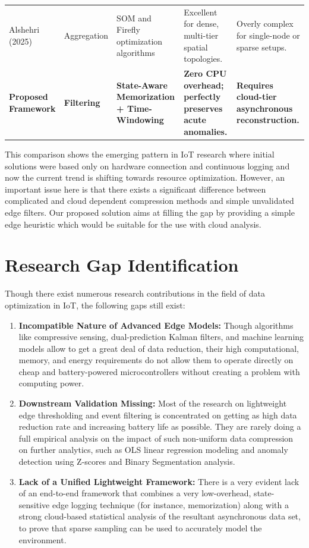 \begin{table}[htpb]
{\begin{tabular}{@{}llp{4cm}p{4cm}p{4cm}@{}}
        \addlinespace
        Alshehri (2025) \cite{ref17, ref37, ref57} & Aggregation & SOM and Firefly optimization algorithms & Excellent for dense, multi-tier spatial topologies. & Overly complex for single-node or sparse setups. \\
        \addlinespace
        \textbf{Proposed Framework} & \textbf{Filtering} & \textbf{State-Aware Memorization + Time-Windowing} & \textbf{Zero CPU overhead; perfectly preserves acute anomalies.} & \textbf{Requires cloud-tier asynchronous reconstruction.} \\
        \bottomrule
    \end{tabular}
    }
\end{table}

This comparison shows the emerging pattern in IoT research where initial solutions were based only on hardware connection and continuous logging and now the current trend is shifting towards resource optimization. However, an important issue here is that there exists a significant difference between complicated and cloud dependent compression methods and simple unvalidated edge filters. Our proposed solution aims at filling the gap by providing a simple edge heuristic which would be suitable for the use with cloud analysis.

\section{Research Gap Identification}
Though there exist numerous research contributions in the field of data optimization in IoT, the following gaps still exist:
\begin{enumerate}
    \item \textbf{Incompatible Nature of Advanced Edge Models:} Though algorithms like compressive sensing, dual-prediction Kalman filters, and machine learning models allow to get a great deal of data reduction, their high computational, memory, and energy requirements do not allow them to operate directly on cheap and battery-powered microcontrollers without creating a problem with computing power.
    \item \textbf{Downstream Validation Missing:} Most of the research on lightweight edge thresholding and event filtering is concentrated on getting as high data reduction rate and increasing battery life as possible. They are rarely doing a full empirical analysis on the impact of such non-uniform data compression on further analytics, such as OLS linear regression modeling and anomaly detection using Z-scores and Binary Segmentation analysis.
  \item \textbf{Lack of a Unified Lightweight Framework:} There is a very evident lack of an end-to-end framework that combines a very low-overhead, state-sensitive edge logging technique (for instance, memorization) along with a strong cloud-based statistical analysis of the resultant asynchronous data set, to prove that sparse sampling can be used to accurately model the environment.
\end{enumerate}

